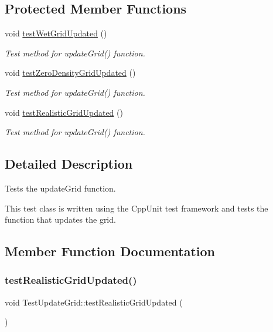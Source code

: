 \subsection*{Protected Member Functions}
\begin{DoxyCompactItemize}
\item 
void \hyperlink{class_test_update_grid_a96aa33a3e1362f9a24237c234a13f3b9}{test\+Wet\+Grid\+Updated} ()
\begin{DoxyCompactList}\small\item\em Test method for update\+Grid() function. \end{DoxyCompactList}\item 
void \hyperlink{class_test_update_grid_ac9edeb07286572669ab1464895f3f452}{test\+Zero\+Density\+Grid\+Updated} ()
\begin{DoxyCompactList}\small\item\em Test method for update\+Grid() function. \end{DoxyCompactList}\item 
void \hyperlink{class_test_update_grid_a5ae8a15bf6d4fc2429b9e0b0946b08c8}{test\+Realistic\+Grid\+Updated} ()
\begin{DoxyCompactList}\small\item\em Test method for update\+Grid() function. \end{DoxyCompactList}\end{DoxyCompactItemize}


\subsection{Detailed Description}
Tests the update\+Grid function. 

This test class is written using the Cpp\+Unit test framework and tests the function that updates the grid. 

\subsection{Member Function Documentation}
\mbox{\label{class_test_update_grid_a5ae8a15bf6d4fc2429b9e0b0946b08c8}} 
\subsubsection{\texorpdfstring{test\+Realistic\+Grid\+Updated()}{testRealisticGridUpdated()}}
{\footnotesize\ttfamily void Test\+Update\+Grid\+::test\+Realistic\+Grid\+Updated (\begin{DoxyParamCaption}{ }\end{DoxyParamCaption})\hspace{0.3cm}{\ttfamily [protected]}}




